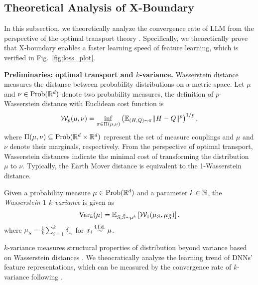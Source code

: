 \subsection{Theoretical Analysis of X-Boundary}
\label{sec:theoretical}
In this subsection, we theoretically analyze the convergence rate of LLM from the perspective of the optimal transport theory \cite{solomon2020k, chuang2021measuring, weed2017sharp}. Specifically, we theoretically prove that X-boundary enables a faster learning speed of feature learning, which is verified in Fig.~\ref{fig:loss_plot}.

\textbf{Preliminaries: optimal transport and $k$-variance.} Wasserstein distance measures the distance between probability distributions on a metric space. Let $\mu$ and $\nu \in \textnormal{Prob}({\mathbb{R}}^d)$ denote two probability measures, the definition of $p$-Wasserstein distance with Euclidean cost function is
\begin{equation}
    {\mathcal{W}}_p(\mu, \nu) = \inf_{\pi \in \Pi(\mu, \nu)} \left( \mathbb{E}_{(H,Q) \sim \pi} \|H-Q\|^p\right)^{1/p},
\end{equation}
where $\Pi(\mu, \nu) \subseteq \textnormal{Prob}({\mathbb{R}}^d \times {\mathbb{R}}^d)$ represent the set of measure couplings and $\mu$ and $\nu$ denote their marginals, respectively. From the perspective of optimal transport, Wasserstein distances indicate the minimal cost of transforming the distribution $\mu$ to $\nu$. Typically, the Earth Mover distance is equivalent to the 1-Wasserstein distance. 

\begin{definition}
Given a probability measure $\mu \in \textnormal{Prob}({\mathbb{R}}^d)$ and a parameter $k \in {\mathbb{N}}$, the \emph{Wasserstein-$1$ $k$-variance} is given as
\begin{equation}
    \mathrm{Var}_{k}(\mu) =  \mathbb{E}_{S, \tilde{S} \sim \mu^k} \left[ {\mathcal{W}}_1(\mu_S, \mu_{\tilde{S}} ) \right],
\end{equation}
where $\mu_S = \frac{1}{k}\sum_{i=1}^k \delta_{x_i}$ for $x_i \overset{\textnormal{i.i.d.}}{\sim} \mu $.
\end{definition}

$k$-variance measures structural properties of distribution beyond variance based on Wasserstein distances \cite{solomon2020k}. We theocratically analyze the learning trend of DNNs' feature representations, which can be measured by the convergence rate of $k$-variance following \cite{weed2017sharp, solomon2020k}.



